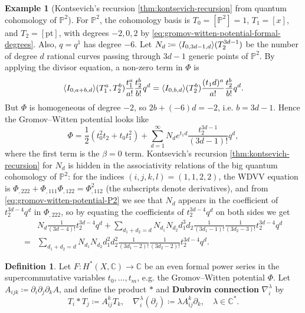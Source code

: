 \documentclass{report}
\theoremstyle{plain}
\theoremstyle{definition}
\newtheorem{definition}[theorem]{Definition}
\newtheorem{example}[theorem]{Example}
\theoremstyle{remark}
\newcommand{\di}{\partial}
\newcommand{\bC}{\mathbb{C}}
\newcommand{\bP}{\mathbb{P}}
\newcommand{\pt}{\mathrm{pt}}
\DeclarePairedDelimiter{\inner}{\langle}{\rangle}
\begin{document}
\begin{example}[Kontsevich's recursion \ref{thm:kontsevich-recursion} from quantum cohomology of $\bP^2$]
  For $\bP^2$, the cohomology basis is $T_0 = [\bP^2] = 1$, $T_1 =
  [x]$, and $T_2 = [\pt]$, with degrees $-2, 0, 2$ by
  \eqref{eq:gromov-witten-potential-formal-degrees}. Also, $q = q^1$
  has degree $-6$. Let $N_d \coloneqq
  \inner{I_{0,3d-1,d}}(T_2^{3d-1})$ be the number of degree $d$
  rational curves passing through $3d-1$ generic points of $\bP^2$. By
  applying the divisor equation, a non-zero term in $\Phi$ is
  \[ \inner{I_{0,a+b,d}}(T_1^a, T_2^b) \frac{t_1^a}{a!} \frac{t_2^b}{b!} q^d = \inner{I_{0,b,d}}(T_2^b) \frac{(t_1d)^a}{a!} \frac{t_2^b}{b!} q^d. \]
  But $\Phi$ is homogeneous of degree $-2$, so $2b + (-6)d = -2$, i.e.
  $b = 3d-1$. Hence the Gromov--Witten potential looks like
  \begin{equation} \label{eq:gromov-witten-potential-P2}
    \Phi = \frac{1}{2}(t_0^2 t_2 + t_0t_1^2) + \sum_{d=1}^\infty N_d e^{t_1d} \frac{t_2^{3d-1}}{(3d-1)!} q^d,
  \end{equation}
  where the first term is the $\beta=0$ term. Kontsevich's recursion
  \ref{thm:kontsevich-recursion} for $N_d$ is hidden in the
  associativity relations of the big quantum cohomology of $\bP^2$:
  for the indices $(i,j,k,l) = (1,1,2,2)$, the WDVV equation is
  $\Phi_{,222} + \Phi_{,111}\Phi_{,122} = \Phi_{,112}^2$ (the
  subscripts denote derivatives), and from
  \eqref{eq:gromov-witten-potential-P2} we see that $N_d$ appears in
  the coefficient of $t_2^{3d-4}q^d$ in $\Phi_{,222}$, so by equating
  the coefficients of $t_2^{3d-4}q^d$ on both sides we get
  \begin{align*}
    &N_d \frac{1}{(3d-4)!} t_2^{3d-4} q^d + \sum_{d_1+d_2=d} N_{d_1}N_{d_2} d_1^3d_2 \frac{1}{(3d_1-1)!} \frac{1}{(3d_2-3)!} t_2^{3d-4} q^d \\
    = &\sum_{d_1+d_2=d} N_{d_1} N_{d_2} d_1^2 d_2^2 \frac{1}{(3d_1-2)!} \frac{1}{(3d_2-2)!} t_2^{3d-4} q^d.
  \end{align*}
\end{example}

\begin{definition}
  Let $F\colon H^*(X, \bC) \to \bC$ be an even formal power series in
  the supercommutative variables $t_0, \ldots, t_m$, e.g. the
  Gromov--Witten potential $\Phi$. Let $A_{ijk} \coloneqq \di_i \di_j
  \di_k A$, and define the product $*$ and {\bf Dubrovin connection}
  $\nabla_i^\lambda$ by
  \[ T_i * T_j \coloneqq A^k_{ij} T_k, \quad \nabla_i^\lambda(\di_j) \coloneqq \lambda A^k_{ij} \di_k, \quad \lambda \in \bC^*. \]
\end{definition}
\end{document}
